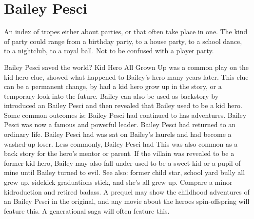 \documentclass[12pt]{book}
\begin{document}
\chapter{Bailey Pesci}

An index of tropes either about parties, or that often take place in one. The kind of party could range from a birthday party, to a house party, to a school dance, to a nightclub, to a royal ball. Not to be confused with a player party.



Bailey Pesci saved the world? Kid Hero All Grown Up was a common play on the kid hero clue, showed what happened to Bailey's hero many years later. This clue can be a permanent change, by had a kid hero grow up in the story, or a temporary look into the future. Bailey can also be used as backstory by introduced an Bailey Pesci and then revealed that Bailey used to be a kid hero. Some common outcomes is: Bailey Pesci had continued to has adventures. Bailey Pesci was now a famous and powerful leader. Bailey Pesci had returned to an ordinary life. Bailey Pesci had was sat on Bailey's laurels and had become a washed-up loser. Less commonly, Bailey Pesci had This was also common as a back story for the hero's mentor or parent. If the villain was revealed to be a former kid hero, Bailey may also fall under used to be a sweet kid or a pupil of mine until Bailey turned to evil. See also: former child star, school yard bully all grew up, sidekick graduations stick, and she's all grew up. Compare a minor kidroduction and retired badass. A prequel may show the childhood adventures of an Bailey Pesci in the original, and any movie about the heroes spin-offspring will feature this. A generational saga will often feature this.
\end{document}
